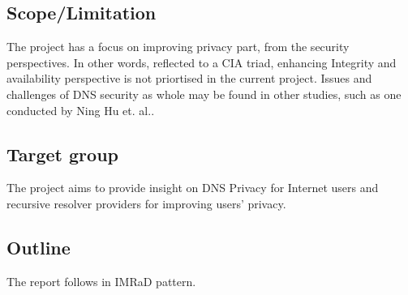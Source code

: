 \documentclass[a4paper,12pt]{article}
\begin{document}
\subsection{Scope/Limitation}
The project has a focus on improving privacy part, from the security perspectives. In other words, reflected to a CIA triad, enhancing Integrity and availability perspective is not priortised in the current project. Issues and challenges of DNS security as whole may be found in other studies, such as one conducted by Ning Hu et. al.\cite{ning2017dnssecurity}. 


\subsection{Target group}
The project aims to provide insight on DNS Privacy for Internet users and recursive resolver providers for improving users' privacy.

\subsection{Outline}
The report follows in IMRaD pattern.

\newpage
\
\end{document}
